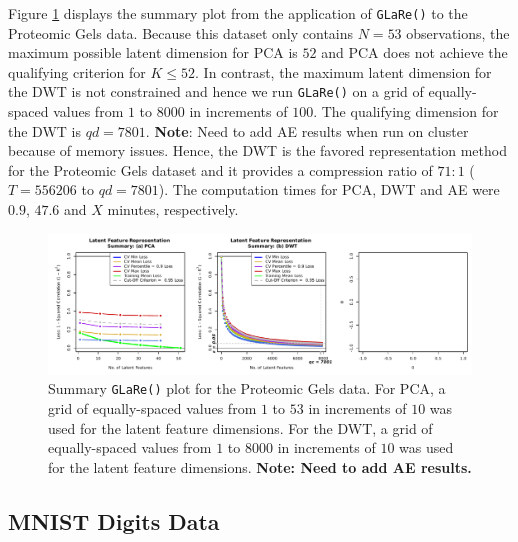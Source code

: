 Figure \ref{fig:gels-results} displays the summary plot from the application of \texttt{GLaRe()} to the Proteomic Gels data.
Because this dataset only contains $N=53$ observations, the maximum possible latent dimension for PCA is $52$ and PCA does not achieve the qualifying criterion for $K \leq 52$.
In contrast, the maximum latent dimension for the DWT is not constrained and hence we run \texttt{GLaRe()} on a grid of equally-spaced values from $1$ to $8000$ in increments of $100$.
The qualifying dimension for the DWT is $qd=7801$.
{\color{purple}\textbf{Note}: Need to add AE results when run on cluster because of memory issues.}
Hence, the DWT is the favored representation method for the Proteomic Gels dataset and it provides a compression ratio of $71:1$ ($T = 556206$ to $qd = 7801$).
The computation times for PCA, DWT and AE were $0.9$, $47.6$ and {\color{purple}$X$} minutes, respectively.


\begin{figure}
    \centering
    \includegraphics[width=1\linewidth]{figures/gels-results.pdf}
    \caption{Summary \texttt{GLaRe()} plot for the Proteomic Gels data. For PCA, a grid of equally-spaced values from $1$ to $53$ in increments of $10$ was used for the latent feature dimensions.
    For the DWT,  a grid of equally-spaced values from $1$ to $8000$ in increments of $10$ was used for the latent feature dimensions. {\color{purple} \textbf{Note: Need to add AE results.}}}
    \label{fig:gels-results}
\end{figure}


\subsection{MNIST Digits Data}

